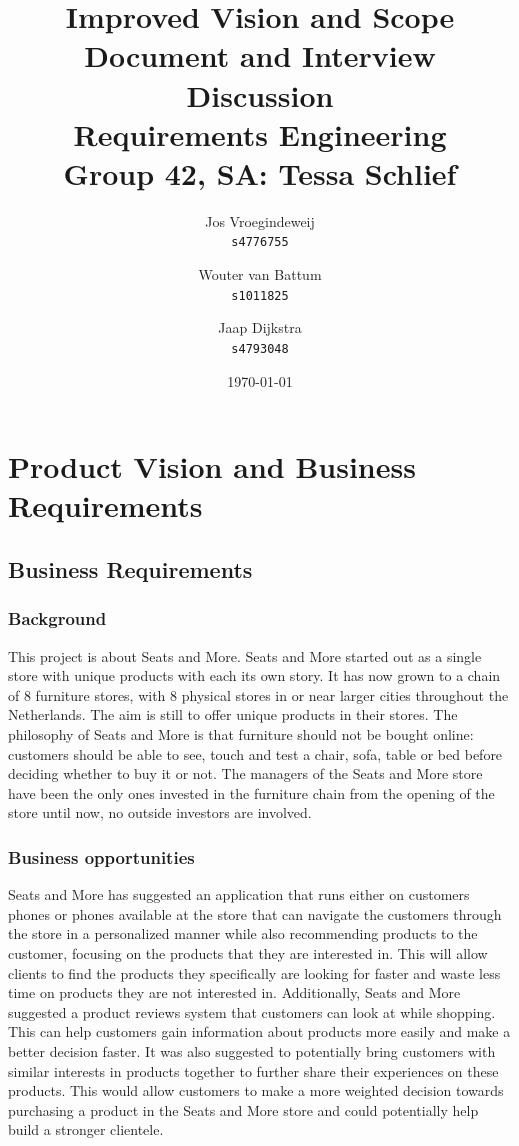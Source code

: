 \documentclass[a4paper]{article}
\title{\textbf{Improved Vision and Scope Document and Interview Discussion}\\\large Requirements Engineering\\Group 42, SA: Tessa Schlief}
\author{Jos Vroegindeweij\\\texttt{s4776755} \and Wouter van Battum\\\texttt{s1011825}
\and Jaap Dijkstra\\\texttt{s4793048}}
\date{\today}
\begin{document}
\maketitle
\color{black}
\section{Product Vision and Business Requirements}
\subsection*{Business Requirements}
\subsubsection*{Background}
This project is about Seats and More. \color{blue}Seats and More started out as a single store with unique products with each its own story. It has now grown to a chain of 8 furniture stores, \color{black}with 8 physical stores in or near larger cities throughout the Netherlands. \color{blue} The aim is still to offer unique products in their stores. \color{black} The philosophy of Seats and More is that furniture should not be bought online: customers should be able to see, touch and test a chair, sofa, table or bed before deciding whether to buy it or not. \color{blue} The managers of the Seats and More store have been the only ones invested in the furniture chain from the opening of the store until now, no outside investors are involved. \color{black}

\subsubsection*{Business opportunities}
Seats and More has suggested an application that runs either on customers phones or phones available at the store that can navigate the customers through the store in a personalized manner while also recommending products to the customer, focusing on the products that they are interested in. This will allow clients to find the products they specifically are looking for faster and waste less time on products they are not interested in. Additionally, Seats and More suggested a product reviews system that customers can look at while shopping. \color{blue} This can help customers gain information about products more easily and make a better decision faster. \color{black}It was also suggested to potentially bring customers with similar interests in products together to further share their experiences on these products. This would allow customers to make a more weighted decision towards purchasing a product in the Seats and More store \color{blue}and could potentially help build a stronger clientele. \color{black}
\end{document}
